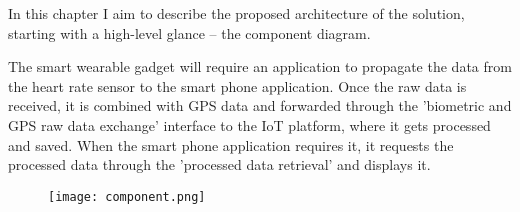 \linebreak
In this chapter I aim to describe the proposed architecture of the solution, starting with a high-level glance -- the component diagram.

The smart wearable gadget will require an application to propagate the data from the heart rate sensor to the smart phone application.
Once the raw data is received, it is combined with GPS data and forwarded through the 'biometric and GPS raw data exchange' interface to the IoT platform, where it gets processed and saved.
When the smart phone application requires it, it requests the processed data through the 'processed data retrieval' and displays it.

\begin{figure}[h]
\texttt{[image: component.png]}
\end{figure}